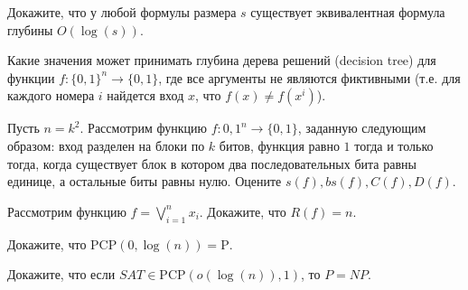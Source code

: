 \setcounter{curtask}{9}


\begin{task}
    Докажите, что у любой формулы размера $s$ существует эквивалентная формула глубины $O(\log(s))$.
\end{task}

\begin{task}
    Какие значения может принимать глубина дерева решений (decision tree) для функции $f: \{0, 1\}^n \rightarrow \{0, 1\}$, где
    все аргументы не являются фиктивными (т.е. для каждого номера $i$ найдется вход $x$, что $f(x) \neq f(x^{i})$).
\end{task}

\begin{task}
    Пусть $n = k^2$. Рассмотрим функцию $f: {0, 1}^n \rightarrow \{0, 1\}$, заданную следующим образом: вход разделен на блоки по
    $k$ битов, функция равно $1$ тогда и только тогда, когда существует блок в котором два последовательных бита равны единице, а
    остальные биты равны нулю. Оцените $s(f), bs(f), C(f), D(f)$.
\end{task}

\begin{task}
    Рассмотрим функцию $f = \bigvee\limits_{i = 1}^{n} x_i$. Докажите, что $R(f) = n$.
\end{task}

\begin{task}
    Докажите, что $\mathrm{PCP}(0, \log(n)) = \mathrm{P}$.
\end{task}

\begin{task}
    Докажите, что если $SAT \in \mathrm{PCP}(o(\log(n)), 1)$, то $P = NP$.
\end{task}


